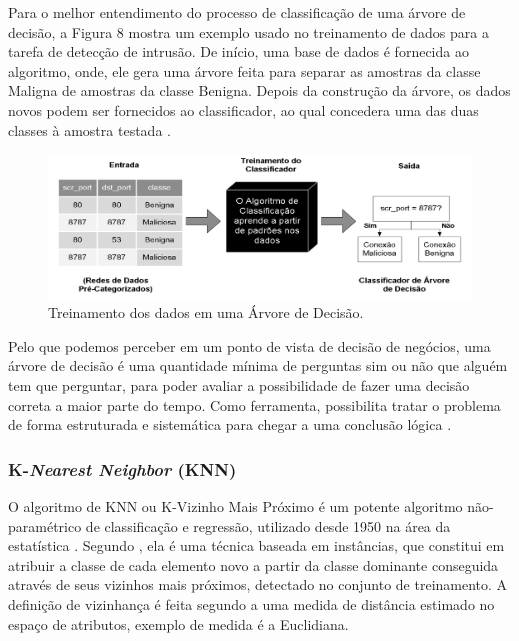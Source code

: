 \par
Para o melhor entendimento do processo de classificação de uma árvore de decisão, a Figura 8 mostra um exemplo usado no treinamento de dados para a tarefa de detecção de intrusão. De início, uma base de dados é fornecida ao algoritmo, onde, ele gera uma árvore feita para separar as amostras da classe Maligna de amostras da classe Benigna. Depois da construção da árvore, os dados novos podem ser fornecidos ao classificador, ao qual concedera uma das duas classes à amostra testada \cite{Henke2011}. 

\begin{figure}[!htp]
	\begin{center}
    \caption{\label{fig:waveform_fig} Treinamento dos dados em uma Árvore de Decisão.}
	\includegraphics[scale=0.50]{Figuras/Arvore_decisao.png}
	\end{center}
\end{figure}

\par
Pelo que podemos perceber em um ponto de vista de decisão de negócios, uma árvore de decisão é uma quantidade mínima de perguntas sim ou não que alguém tem que perguntar, para poder avaliar a possibilidade de fazer uma decisão correta a maior parte do tempo. Como ferramenta, possibilita tratar o problema de forma estruturada e sistemática para chegar a uma conclusão lógica \cite{Sara}. 


\subsubsection{K-\textit{Nearest Neighbor} (KNN)}

\par
O algoritmo de KNN ou K-Vizinho Mais Próximo é um potente algoritmo não-paramétrico de classificação e regressão, utilizado desde 1950 na área da estatística \cite{Carvalho2014}. Segundo , ela é uma técnica baseada em instâncias, que constitui em atribuir a classe de cada elemento novo a partir da classe dominante conseguida através de seus vizinhos mais próximos, detectado no conjunto de treinamento. A definição de vizinhança é feita segundo a uma medida de distância estimado no espaço de atributos, exemplo de medida é a Euclidiana. 

